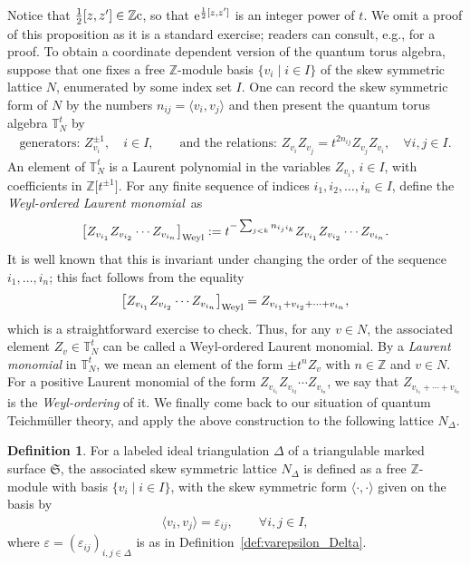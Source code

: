 \documentclass[10pt,a4paper]{amsart}
\numberwithin{equation}{section}
\theoremstyle{definition}
\newtheorem{Definition}[Theorem]{Definition}
\begin{document}
Notice that $\frac{1}{2} [z,z'] \in \mathbb{Z}{\rm c}$, so that ${\rm e}^{\frac{1}{2} [z,z']}$ is an integer power of $t$. We omit a proof of this proposition as it is a standard exercise; readers can consult, e.g., \cite{Kim_mutation} for a proof.
To obtain a coordinate dependent version of the quantum torus algebra, suppose that one fixes a free $\mathbb{Z}$-module basis $\{v_i \mid i \in I\}$ of the skew symmetric lattice $N$, enumerated by some index set $I$. One can record the skew symmetric form of $N$ by the numbers $n_{ij} = \langle v_i, v_j \rangle$ and then present the quantum torus algebra $\mathbb{T}^t_N$ by
\begin{align*}
\mbox{generators: } Z_{v_i}^{\pm 1}, \quad i\in I, \qquad \mbox{and the relations: } Z_{v_i} Z_{v_j} = t^{2 n_{ij}} Z_{v_j} Z_{v_i}, \quad \forall i,j\in I.
\end{align*}
An element of $\mathbb{T}^t_N$ is a Laurent polynomial in the variables $Z_{v_i}$, $i\in I$, with coefficients in $\mathbb{Z}\bigl[t^{\pm 1}\bigr]$. For any finite sequence of indices $i_1,i_2,\dots,i_n \in I$, define the {\em Weyl-ordered Laurent monomial}~as
\begin{align}
\label{eq:Weyl-ordering}
\bigl[Z_{v_{i_1}} Z_{v_{i_2}} \cdots Z_{v_{i_n}} \bigr]_{\rm Weyl} := t^{-\sum_{j<k} n_{i_j i_k}} Z_{v_{i_1}} Z_{v_{i_2}} \cdots Z_{v_{i_n}}.
\end{align}
It is well known that this is invariant under changing the order of the sequence $i_1,\dots,i_n$; this fact follows from the equality
\[
\bigl[Z_{v_{i_1}} Z_{v_{i_2}} \cdots Z_{v_{i_n}} \bigr]_{\rm Weyl} = Z_{v_{i_1} + v_{i_2} + \cdots + v_{i_n}},
\]
which is a straightforward exercise to check. Thus, for any $v\in N$, the associated element $Z_v \in \mathbb{T}^t_N$ can be called a Weyl-ordered Laurent monomial. By a {\em Laurent monomial} in $\mathbb{T}^t_N$, we mean an element of the form $\pm t^n Z_v$ with $n \in \mathbb{Z}$ and $v\in N$. For a positive Laurent monomial of the form $Z_{v_{i_1}} Z_{v_{i_2}} \cdots Z_{v_{i_n}}$, we say that $Z_{v_{i_1}+\cdots+v_{i_n}}$ is the {\em Weyl-ordering} of it.
We finally come back to our situation of quantum Teichm\"uller theory, and apply the above construction to the following lattice $N_\Delta$.
\begin{Definition}\label{def:N_Delta}
For a labeled ideal triangulation $\Delta$ of a triangulable marked surface $\mathfrak{S}$, the associated skew symmetric lattice $N_\Delta$ is defined as a free $\mathbb{Z}$-module with basis $\{v_i \mid i \in I\}$, with the skew symmetric form $\langle \cdot, \cdot \rangle$ given on the basis by
\begin{align}
\label{eq:skew-form_for_Delta}
\langle v_i, v_j \rangle = \varepsilon_{ij}, \qquad \forall i,j \in I,
\end{align}
where $\varepsilon = (\varepsilon_{ij})_{i,j\in \Delta}$ is as in Definition~\ref{def:varepsilon_Delta}.
\end{Definition}
\end{document}
